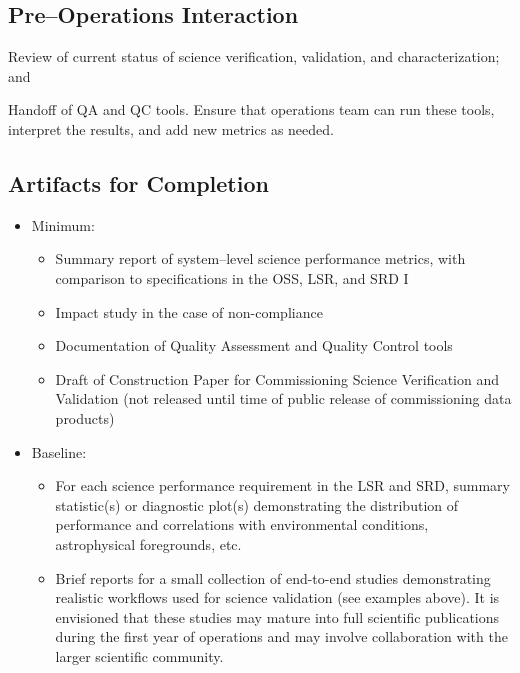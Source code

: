 \subsection{Pre--Operations Interaction}
Review of current status of science verification, validation, and characterization; and 

Handoff of QA and QC tools. Ensure that operations team can run these tools, interpret the results, and add new metrics as needed.

\subsection{Artifacts for Completion}

\begin{itemize}

	\item Minimum:
		\begin{itemize}
			\item Summary report of system--level science performance metrics, with comparison to specifications in the OSS, LSR, and SRD
I			\item Impact study in the case of non-compliance
			\item Documentation of Quality Assessment and Quality Control tools
			\item Draft of Construction Paper for Commissioning Science Verification and Validation (not released until time of public release of commissioning data products)
		\end{itemize}
		
	\item Baseline:
		\begin{itemize}
			\item For each science performance requirement in the LSR and SRD, summary statistic(s) or diagnostic plot(s) demonstrating the distribution of performance and correlations with environmental conditions, astrophysical foregrounds, etc.
			\item Brief reports for a small collection of end-to-end studies demonstrating realistic workflows used for science validation (see examples above). It is envisioned that these studies may mature into full scientific publications during the first year of operations and may involve collaboration with the larger scientific community.
		\end{itemize}
		
	\end{itemize}






